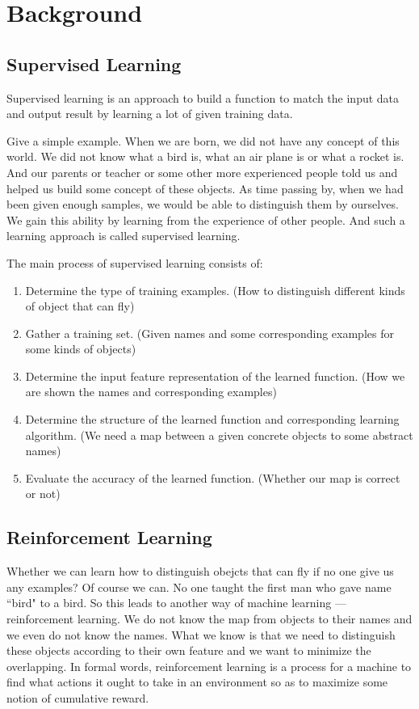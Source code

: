 \documentclass[a4paper,12pt]{article}
\begin{document}
\section{Background}
\subsection{Supervised Learning}
Supervised learning is an approach to build a function to match the input data and output result by learning a lot of given training data. 

Give a simple example. When we are born, we did not have any concept of this world. We did not know what a bird is, what an air plane is or what a rocket is. And our parents or teacher or some other more experienced people told us and helped us build some concept of these objects. As time passing by, when we had been given enough samples, we would be able to distinguish them by ourselves. We gain this ability by learning from the experience of other people. And such a learning approach is called supervised learning.

The main process of supervised learning consists of: 
\begin{enumerate}
\item Determine the type of training examples. (How to distinguish different kinds of object that can fly) 
\item Gather a training set. (Given names and some corresponding examples for some kinds of objects)
\item Determine the input feature representation of the learned function. (How we are shown the names and corresponding examples)
\item Determine the structure of the learned function and corresponding learning algorithm. (We need a map between a given concrete objects to some abstract names)
\item Evaluate the accuracy of the learned function. (Whether our map is correct or not)
\end{enumerate}   

\subsection{Reinforcement Learning}
Whether we can learn how to distinguish obejcts that can fly if no one give us any examples? Of course we can. No one taught the first man who gave name ``bird" to a bird. So this leads to another way of machine learning --- reinforcement learning. We do not know the map from objects to their names and we even do not know the names. What we know is that we need to distinguish these objects according to their own feature and we want to minimize the overlapping. In formal words, reinforcement learning is a process for a machine to find what actions it ought to take in an environment so as to maximize some notion of cumulative reward.
\end{document}
